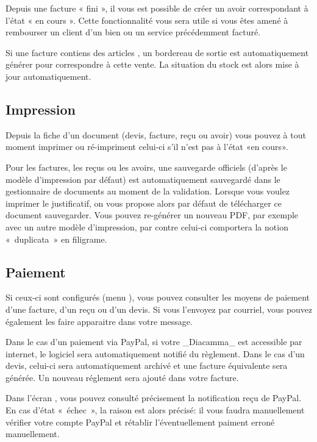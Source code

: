 \documentclass[a4paper,10pt,oneside,french]{sphinxmanual}
\begin{document}
Depuis une facture « fini », il vous est possible de créer un avoir correspondant à l’état « en cours ». Cette fonctionnalité vous sera utile si vous êtes amené à rembourser un client d’un bien ou un service précédemment facturé.

Si une facture contiens des articles , un bordereau de sortie est automatiquement générer pour correspondre à cette vente.
La situation du stock est alors mise à jour automatiquement.


\subsection{Impression}
\label{\detokenize{invoice/create_bill:impression}}
Depuis la fiche d’un document (devis, facture, reçu ou avoir) vous pouvez à tout moment imprimer ou ré-impriment celui-ci s’il n’est pas à l’état «en cours».

Pour les factures, les reçus ou les avoirs, une sauvegarde officiels (d’après le modèle d’impression par défaut) est automatiquement sauvegardé dans le gestionnaire de documents au moment de la validation.
Lorsque vous voulez imprimer le justificatif, on vous propose alors par défaut de télécharger ce document sauvegarder.
Vous pouvez re-générer un nouveau PDF, par exemple avec un autre modèle d’impression, par contre celui-ci comportera la notion « duplicata » en filigrame.


\subsection{Paiement}
\label{\detokenize{invoice/create_bill:paiement}}
Si ceux-ci sont configurés (menu ), vous pouvez consulter les moyens de paiement d’une facture, d’un reçu ou d’un devis.
Si vous l’envoyez par courriel, vous pouvez également les faire apparaitre dans votre message.

Dans le cas d’un paiement via PayPal, si votre \_Diacamma\_ est accessible par internet, le logiciel sera automatiquement notifié du règlement.
Dans le cas d’un devis, celui-ci sera automatiquement archivé et une facture équivalente sera générée.
Un nouveau réglement sera ajouté dans votre facture.

Dans l’écran , vous pouvez consulté précisement la notification reçu de PayPal.
En cas d’état « échec », la raison est alors précisé: il vous faudra manuellement vérifier votre compte PayPal et rétablir l’éventuellement paiment erroné manuellement.
\end{document}

